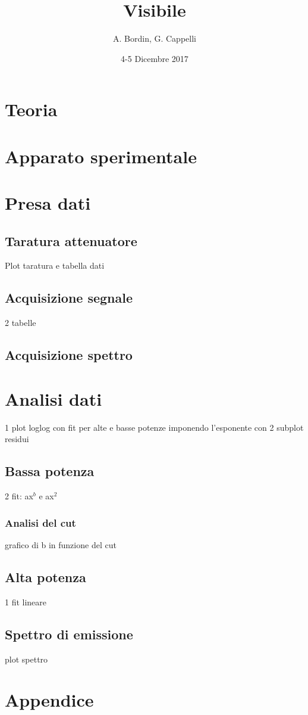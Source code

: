 \documentclass[a4paper]{article}
\author{A. Bordin, G. Cappelli}
\title{Visibile}
\date{4-5 Dicembre 2017}
\begin{document}
	\maketitle
	
	\begin{abstract}
		 
	\end{abstract}
	
\section{Teoria}

\section{Apparato sperimentale}

\section{Presa dati}

\subsection{Taratura attenuatore}

Plot taratura e tabella dati

\subsection{Acquisizione segnale}

2 tabelle

\subsection{Acquisizione spettro}

\section{Analisi dati}

1 plot loglog con fit per alte e basse potenze imponendo l'esponente con 2 subplot residui

\subsection{Bassa potenza}

2 fit: ax$^b$ e ax$^2$

\subsubsection{Analisi del cut}

grafico di b in funzione del cut

\subsection{Alta potenza}

1 fit lineare

\subsection{Spettro di emissione}

plot spettro

\newpage
\section*{Appendice}
	
\end{document}
